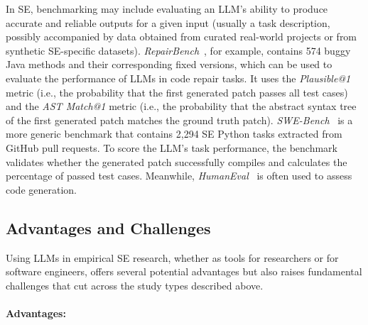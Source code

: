 \documentclass[smallextended]{svjour3}
\newcommand{\studytypeparagraph}[1]{\paragraph{\bfseries #1:}}
\newcommand{\studytypeparagraph}[1]{\subsubsection{#1}}
\begin{document}
In SE, benchmarking may include evaluating an LLM's ability to produce accurate and reliable outputs for a given input (usually a task description, possibly accompanied by data obtained from curated real-world projects or from synthetic SE-specific datasets). \emph{RepairBench}~\cite{DBLP:conf/llm4code/SilvaM25}, for example, contains 574 buggy Java methods and their corresponding fixed versions, which can be used to evaluate the performance of LLMs in code repair tasks. It uses the \emph{Plausible@1} metric (i.e., the probability that the first generated patch passes all test cases) and the \emph{AST Match@1} metric (i.e., the probability that the abstract syntax tree of the first generated patch matches the ground truth patch).
\emph{SWE-Bench}~\cite{DBLP:conf/iclr/JimenezYWYPPN24} is a more generic benchmark that contains 2,294 SE Python tasks extracted from GitHub pull requests.
To score the LLM's task performance, the benchmark validates whether the generated patch successfully compiles and calculates the percentage of passed test cases. Meanwhile, \emph{HumanEval}~\cite{DBLP:journals/corr/abs-2107-03374} is often used to assess code generation. 
\space%

\subsection{Advantages and Challenges}
\label{sec:advantages-challenges}

Using LLMs in empirical SE research, whether as tools for researchers or for software engineers, offers several potential advantages but also raises fundamental challenges that cut across the study types described above.

\studytypeparagraph{Advantages}
\end{document}
